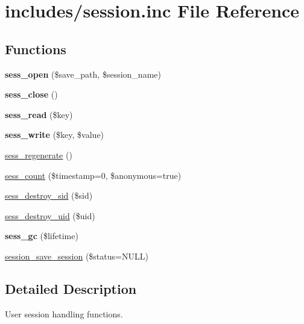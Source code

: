 \hypertarget{session_8inc}{
\section{includes/session.inc File Reference}
\label{session_8inc}
}
\subsection*{Functions}
\begin{CompactItemize}
\item 
\hypertarget{session_8inc_a57b9e3f9d8c3a7cd59ee8f5e0a18c32}{
\textbf{sess\_\-open} (\$save\_\-path, \$session\_\-name)}
\label{session_8inc_a57b9e3f9d8c3a7cd59ee8f5e0a18c32}

\item 
\hypertarget{session_8inc_2df8e2d2199bd3f93fd52ee1a6d5a6b7}{
\textbf{sess\_\-close} ()}
\label{session_8inc_2df8e2d2199bd3f93fd52ee1a6d5a6b7}

\item 
\hypertarget{session_8inc_0f7954005527dba422f3f25b42d32ae0}{
\textbf{sess\_\-read} (\$key)}
\label{session_8inc_0f7954005527dba422f3f25b42d32ae0}

\item 
\hypertarget{session_8inc_f16fe7bb14568e6eeae0b8153ef528c9}{
\textbf{sess\_\-write} (\$key, \$value)}
\label{session_8inc_f16fe7bb14568e6eeae0b8153ef528c9}

\item 
\hyperlink{session_8inc_621c1d926868f31898dbf7c90c82620d}{sess\_\-regenerate} ()
\item 
\hyperlink{session_8inc_ad174594c4667d63374cc5e119b41c16}{sess\_\-count} (\$timestamp=0, \$anonymous=true)
\item 
\hyperlink{session_8inc_7afedd239d078990780ecc2745e64afb}{sess\_\-destroy\_\-sid} (\$sid)
\item 
\hyperlink{session_8inc_599b7909c42608adabc65b7fa3b00864}{sess\_\-destroy\_\-uid} (\$uid)
\item 
\hypertarget{session_8inc_a7ccf5242a2bb482c5e9cd7471740d30}{
\textbf{sess\_\-gc} (\$lifetime)}
\label{session_8inc_a7ccf5242a2bb482c5e9cd7471740d30}

\item 
\hyperlink{session_8inc_3b87e39800b48ccf96e034198ec2317b}{session\_\-save\_\-session} (\$status=NULL)
\end{CompactItemize}


\subsection{Detailed Description}
User session handling functions. 

